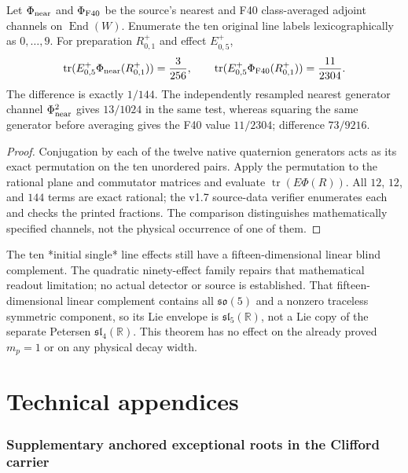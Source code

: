 \documentclass[11pt]{article}
\begin{document}
\begin{corollary}
\label{p1b:cor:v17-petersen-shell-discrimination}
Let $\Phi_{\rm near}$ and $\Phi_{\rm F40}$ be the source's
nearest and F40 class-averaged adjoint channels on $\operatorname{End}(W)$.
Enumerate the ten original line labels lexicographically as $0,\ldots,9$.
For preparation $R^+_{0,1}$ and effect $E^+_{0,5}$,
\[
 \operatorname{tr}(E^+_{0,5}\Phi_{\rm near}(R^+_{0,1}))=\frac3{256},\qquad
 \operatorname{tr}(E^+_{0,5}\Phi_{\rm F40}(R^+_{0,1}))=\frac{11}{2304}.
\]
The difference is exactly $1/144$. The independently resampled
nearest generator channel $\Phi_{\rm near}^2$ gives $13/1024$ in
the same test, whereas squaring the same generator before averaging
gives the F40 value $11/2304$; difference $73/9216$.
\end{corollary}
\begin{proof}
Conjugation by each of the twelve native quaternion generators acts
as its exact permutation on the ten unordered pairs. Apply the
permutation to the rational plane and commutator matrices and evaluate
$\operatorname{tr}(E\Phi(R))$. All $12$, $12$, and $144$ terms are exact
rational; the v1.7 source-data verifier enumerates each and checks the
printed fractions. The comparison distinguishes mathematically
specified channels, not the physical occurrence of one of them.
\end{proof}

\begin{remark}
The ten *initial single* line effects still have a fifteen-dimensional
linear blind complement. The quadratic ninety-effect family repairs
that mathematical readout limitation; no actual detector or source
is established. That fifteen-dimensional linear complement contains
all $\mathfrak{so}(5)$ and a nonzero traceless symmetric component,
so its Lie envelope is $\mathfrak{sl}_5(\mathbb R)$, not a Lie copy of
the separate Petersen $\mathfrak{sl}_4(\mathbb R)$. This theorem has
no effect on the already proved $m_p=1$ or on any physical decay width.
\end{remark}


\clearpage
\appendix
\part*{Technical appendices}
\section{Supplementary anchored exceptional roots in the Clifford carrier}
\label{p1:app:exroot-anchored-construction}
\end{document}
